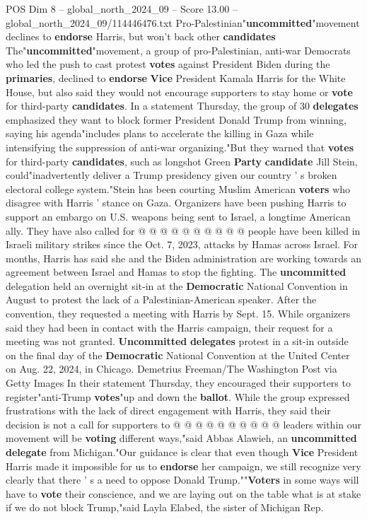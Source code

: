 \begin{textsample}{POS Dim 8 – global\_north\_2024\_09 – Score 13.00 – global\_north\_2024\_09/114446476.txt}  \label{ex:f8_pos_089}
Pro-Palestinian"\textbf{uncommitted}"movement declines to \textbf{endorse} Harris, but won't back other \textbf{candidates} The"\textbf{uncommitted}"movement, a group of pro-Palestinian, anti-war Democrats who led the push to cast protest \textbf{votes} against President Biden during the \textbf{primaries}, declined to \textbf{endorse} \textbf{Vice} President Kamala Harris for the White House, but also said they would not encourage supporters to stay home or \textbf{vote} for third-party \textbf{candidates}.
In a statement Thursday, the group of 30 \textbf{delegates} emphasized they want to block former President Donald Trump from winning, saying his agenda"includes plans to accelerate the killing in Gaza while intensifying the suppression of anti-war organizing."But they warned that \textbf{votes} for third-party \textbf{candidates}, such as longshot Green \textbf{Party} \textbf{candidate} Jill Stein, could"inadvertently deliver a Trump presidency given our country ' s broken electoral college system."Stein has been courting Muslim American \textbf{voters} who disagree with Harris ' stance on Gaza.
Organizers have been pushing Harris to support an embargo on U.S. weapons being sent to Israel, a longtime American ally.
They have also called for @ @ @ @ @ @ @ @ @ @ people have been killed in Israeli military strikes since the Oct. 7, 2023, attacks by Hamas across Israel.
For months, Harris has said she and the Biden administration are working towards an agreement between Israel and Hamas to stop the fighting.
The \textbf{uncommitted} delegation held an overnight sit-in at the \textbf{Democratic} National Convention in August to protest the lack of a Palestinian-American speaker.
After the convention, they requested a meeting with Harris by Sept. 15.
While organizers said they had been in contact with the Harris campaign, their request for a meeting was not granted. \textbf{Uncommitted} \textbf{delegates} protest in a sit-in outside on the final day of the \textbf{Democratic} National Convention at the United Center on Aug. 22, 2024, in Chicago.
Demetrius Freeman/The Washington Post via Getty Images In their statement Thursday, they encouraged their supporters to register"anti-Trump \textbf{votes}"up and down the \textbf{ballot}.
While the group expressed frustrations with the lack of direct engagement with Harris, they said their decision is not a call for supporters to @ @ @ @ @ @ @ @ @ @ leaders within our movement will be \textbf{voting} different ways,"said Abbas Alawieh, an \textbf{uncommitted} \textbf{delegate} from Michigan."Our guidance is clear that even though \textbf{Vice} President Harris made it impossible for us to \textbf{endorse} her campaign, we still recognize very clearly that there ' s a need to oppose Donald Trump.""\textbf{Voters} in some ways will have to \textbf{vote} their conscience, and we are laying out on the table what is at stake if we do not block Trump,"said Layla Elabed, the sister of Michigan Rep.

\end{textsample}
